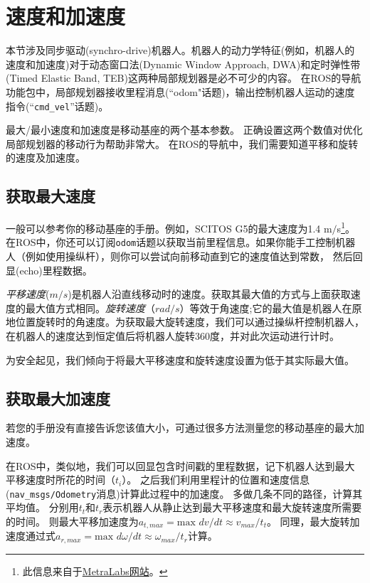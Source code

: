 

\section[Velocity and Acceleration]{速度和加速度}
本节涉及同步驱动(synchro-drive)机器人。机器人的动力学特征(例如，机器人的速度和加速度)对于动态窗口法(Dynamic Window Approach, DWA)和定时弹性带(Timed Elastic Band, TEB)这两种局部规划器是必不可少的内容。
在ROS的导航功能包中，局部规划器接收里程消息(“odom"话题)，输出控制机器人运动的速度指令(“\texttt{cmd_vel}”话题)。

最大/最小速度和加速度是移动基座的两个基本参数。
正确设置这两个数值对优化局部规划器的移动行为帮助非常大。
在ROS的导航中，我们需要知道平移和旋转的速度及加速度。	


\subsection[To obtain maximum velocity]{获取最大速度}
一般可以参考你的移动基座的手册。例如，SCITOS G5的最大速度为1.4 m$/$s\footnote{此信息来自于\href{http://www.metralabs.com/en/research}{MetraLabs网站}。}。
在ROS中，你还可以订阅\texttt{odom}话题以获取当前里程信息。如果你能手工控制机器人（例如使用操纵杆），则你可以尝试向前移动直到它的速度值达到常数，
然后回显(echo)里程数据。

\textit{平移速度}($m/s$)是机器人沿直线移动时的速度。获取其最大值的方式与上面获取速度的最大值方式相同。\textit{旋转速度}（$rad/s$）等效于角速度;它的最大值是机器人在原地位置旋转时的角速度。为获取最大旋转速度，我们可以通过操纵杆控制机器人，在机器人的速度达到恒定值后将机器人旋转360度，并对此次运动进行计时。

为安全起见，我们倾向于将最大平移速度和旋转速度设置为低于其实际最大值。	




\subsection[To obtain maximum acceleration]{获取最大加速度}

若您的手册没有直接告诉您该值大小，可通过很多方法测量您的移动基座的最大加速度。

在ROS中，类似地，我们可以回显包含时间戳的里程数据，记下机器人达到最大平移速度时所花的时间（$t_{i}$）。
之后我们利用里程计的位置和速度信息(\texttt{nav_msgs/Odometry}消息)计算此过程中的加速度。
多做几条不同的路径，计算其平均值。
分别用$t_t$和$t_r$表示机器人从静止达到最大平移速度和最大旋转速度所需要的时间。
则最大平移加速度为$a_{t,max}=\text{max }dv / dt\approx v_{max}/t_t$。
同理，最大旋转加速度通过式$a_{r,max}=\text{max }d\omega / dt\approx \omega_{max}/t_r$计算。

